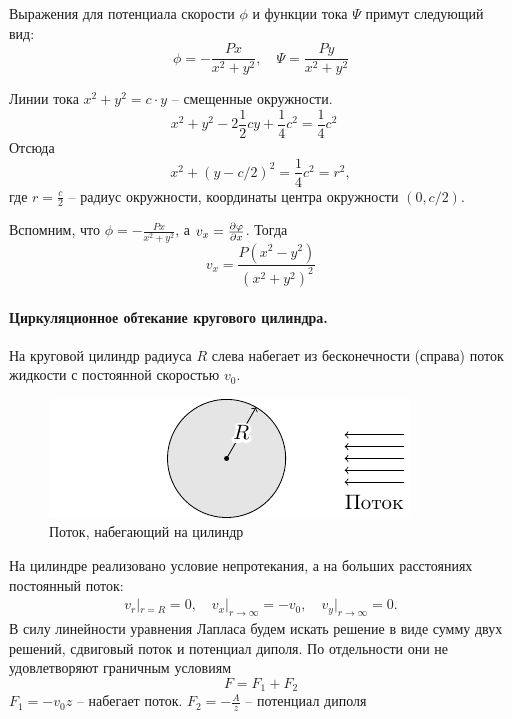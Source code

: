 Выражения для потенциала скорости $\phi$ и функции тока $\Psi$ примут следующий вид:
\begin{equation}
	\phi=-\frac{Px}{x^2+y^2}, \quad
	\Psi=\frac{Py}{x^2+y^2}
\end{equation}


Линии тока $x^2+y^2=c\cdot y$ -- смещенные окружности.
\begin{equation}
	x^2+y^2-2\frac{1}{2}cy+\frac{1}{4}c^2=\frac{1}{4}c^2 \quad
\end{equation}
Отсюда 
\begin{equation}
	x^2+(y-c/2)^2=\frac{1}{4}c^2=r^2,
\end{equation}
где $r=\frac{c}{2}$ -- радиус окружности, координаты центра окружности $(0,c/2)$.

Вспомним, что $\phi=-\frac{Px}{x^2+y^2}$, а $v_x=\pdv{\varphi}{x}$. Тогда 
$$
v_x=\frac{P(x^2-y^2)}{(x^2+y^2)^2}
$$

\paragraph{Циркуляционное обтекание кругового цилиндра.} 
На круговой цилиндр радиуса $R$ слева набегает из бесконечности
(справа) поток жидкости с постоянной скоростью $v_0$.
\begin{figure}[h!]
    \centering
    \includegraphics[scale=1.5]{img/cyl1}
    \caption{Поток, набегающий на цилиндр}
    \label{fig:figure1}
\end{figure}

На цилиндре реализовано условие непротекания, а на больших
расстояниях постоянный поток:
\begin{gather}
	v_r|_{r=R}=0, \quad 
	v_x|_{r\to\infty}=-v_0, \quad
	v_y|_{r\to\infty}=0.
\end{gather}
В силу линейности уравнения Лапласа будем искать решение в виде
сумму двух решений, сдвиговый поток и потенциал диполя. По
отдельности они не удовлетворяют граничным условиям
\begin{equation}
	F=F_1+F_2
\end{equation}
$F_1=-v_0z$ -- набегает поток. 
$\displaystyle F_2=-\frac{A}{z}$ -- потенциал диполя

